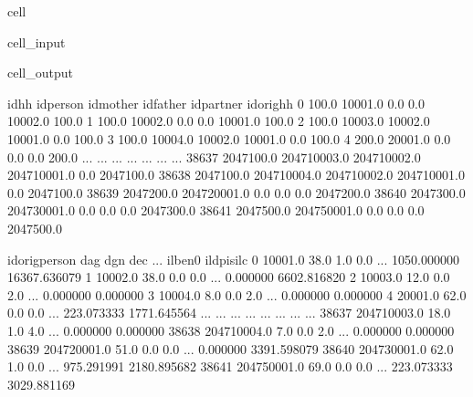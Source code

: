 \documentclass[letterpaper,10pt,english]{sphinxmanual}
\begin{document}
\begin{sphinxuseclass}{cell}
\begin{sphinxuseclass}{cell_input}
\begin{sphinxVerbatim}[commandchars=\\\{\}]
\PYG{p}{[}\PYG{p}{]}\PYG{p}{[}\PYG{p}{]}
\end{sphinxVerbatim}

\end{sphinxuseclass}
\begin{sphinxuseclass}{cell_output}
\begin{sphinxVerbatim}[commandchars=\\\{\}]
            idhh     idperson     idmother     idfather  idpartner   idorighh  \PYGZbs{}
0          100.0      10001.0          0.0          0.0    10002.0      100.0   
1          100.0      10002.0          0.0          0.0    10001.0      100.0   
2          100.0      10003.0      10002.0      10001.0        0.0      100.0   
3          100.0      10004.0      10002.0      10001.0        0.0      100.0   
4          200.0      20001.0          0.0          0.0        0.0      200.0   
...          ...          ...          ...          ...        ...        ...   
38637  2047100.0  204710003.0  204710002.0  204710001.0        0.0  2047100.0   
38638  2047100.0  204710004.0  204710002.0  204710001.0        0.0  2047100.0   
38639  2047200.0  204720001.0          0.0          0.0        0.0  2047200.0   
38640  2047300.0  204730001.0          0.0          0.0        0.0  2047300.0   
38641  2047500.0  204750001.0          0.0          0.0        0.0  2047500.0   

       idorigperson   dag  dgn  dec  ...      il\PYGZus{}ben0    il\PYGZus{}dpisilc  \PYGZbs{}
0           10001.0  38.0  1.0  0.0  ...  1050.000000  16367.636079   
1           10002.0  38.0  0.0  0.0  ...     0.000000   6602.816820   
2           10003.0  12.0  0.0  2.0  ...     0.000000      0.000000   
3           10004.0   8.0  0.0  2.0  ...     0.000000      0.000000   
4           20001.0  62.0  0.0  0.0  ...   223.073333   1771.645564   
...             ...   ...  ...  ...  ...          ...           ...   
38637   204710003.0  18.0  1.0  4.0  ...     0.000000      0.000000   
38638   204710004.0   7.0  0.0  2.0  ...     0.000000      0.000000   
38639   204720001.0  51.0  0.0  0.0  ...     0.000000   3391.598079   
38640   204730001.0  62.0  1.0  0.0  ...   975.291991   2180.895682   
38641   204750001.0  69.0  0.0  0.0  ...   223.073333   3029.881169   


\end{sphinxVerbatim}
\end{sphinxuseclass}
\end{sphinxuseclass}
\end{document}

